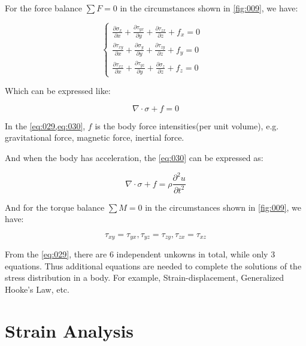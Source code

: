 \documentclass[en,hazy,cyan,8pt,normal]{elegantnote}
\begin{document}
    For the force balance $\sum F=0$ in the circumstances shown in \cref{fig:009}, we have:

    \begin{equation}\label{eq:029}
      \begin{cases}
        \displaystyle \frac{\partial\sigma_x}{\partial x}+\frac{\partial\tau_{yx}}{\partial y}+\frac{\partial\tau_{zx}}{\partial z}+f_x=0 \\
        \displaystyle \frac{\partial\tau_{xy}}{\partial x}+\frac{\partial\sigma_y}{\partial y}+\frac{\partial\tau_{zy}}{\partial z}+f_y=0 \\
        \displaystyle \frac{\partial\tau_{xz}}{\partial x}+\frac{\partial\tau_{yz}}{\partial y}+\frac{\partial\sigma_z}{\partial z}+f_z=0 &
      \end{cases}
    \end{equation}

    Which can be expressed like:

    \begin{equation}\label{eq:030}
      \nabla \cdot \sigma + f = 0
    \end{equation}

    In the \cref{eq:029,eq:030}, $f$ is the body force intensities(per unit volume), e.g. gravitational force, magnetic force, inertial force.

    And when the body has acceleration, the \cref{eq:030} can be expressed as:

    \begin{equation}\label{eq:031}
      \nabla \cdot \sigma + f = \rho \frac{\partial^2 u}{\partial t^2}
    \end{equation}

    And for the torque balance $\sum M=0$ in the circumstances shown in \cref{fig:009}, we have:

    \begin{equation}\label{eq:032}
        \tau_{xy}=\tau_{yx}, \tau_{yz}=\tau_{zy}, \tau_{zx}=\tau_{xz}
    \end{equation}

    From the \cref{eq:029}, there are 6 independent unkowns in total, while only 3 equations. Thus additional equations are needed to complete the solutions of the stress distribution in a body. For example, Strain-displacement, Generalized Hooke's Law, etc.

\section{Strain Analysis}
\end{document}
